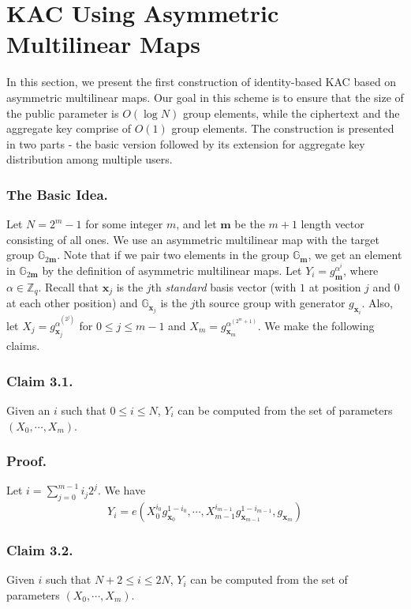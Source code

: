\section{KAC Using Asymmetric Multilinear Maps}
\label{sec:proposal1}

In this section, we present the first construction of identity-based KAC based on asymmetric multilinear maps. Our goal in this scheme is to ensure that the size of the public parameter is $O(\log N)$ group elements, while the ciphertext and the aggregate key comprise of $O(1)$ group elements. The construction is presented in two parts - the basic version followed by its extension for aggregate key distribution among multiple users.

\subsubsection{The Basic Idea.} Let $N=2^m-1$ for some integer $m$, and let $\mathbf{m}$ be the $m+1$ length vector consisting of all ones. We use an asymmetric multilinear map with the target group $\mathbb{G}_{2\mathbf{m}}$. Note that if we pair two elements in the group $\mathbb{G}_{\mathbf{m}}$, we get an element in $\mathbb{G}_{2\mathbf{m}}$ by the definition of asymmetric multilinear maps. Let $Y_i=g^{\alpha^i}_{\mathbf{m}}$, where $\alpha\in\mathbb{Z}_q$. Recall that $\mathbf{x}_j$ is the $j$th \emph{standard} basis vector (with $1$ at position $j$ and $0$ at each other position) and $\mathbb{G}_{\mathbf{x}_j}$ is the $j$th source group with generator $g_{\mathbf{x}_i}$. Also, let $X_j=g^{\alpha^{(2^j)}}_{\mathbf{x}_j}$ for $0\leq j\leq m-1$ and $X_m=g^{\alpha^{(2^m+1)}}_{\mathbf{x}_m}$. We make the following claims.

\subsubsection{Claim 3.1.} Given an $i$ such that $0\leq i\leq N$, $Y_i$ can be computed from the set of parameters $(X_0,\cdots,X_m)$.
\subsubsection{Proof.} Let $i=\sum_{j=0}^{m-1}i_j2^j$. We have 
\begin{equation}
 Y_i=e(X^{i_0}_0g^{1-i_0}_{\mathbf{x}_0},\cdots,X^{i_{m-1}}_{m-1}g^{1-i_{m-1}}_{\mathbf{x}_{m-1}},g_{\mathbf{x}_m})\nonumber
\end{equation}
\subsubsection{Claim 3.2.} Given $i$ such that $N+2\leq i \leq 2N$, $Y_i$ can be computed from the set of parameters $(X_0,\cdots,X_m)$.
